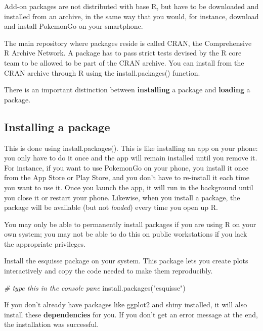 \documentclass[
  oneside]{book}
\newenvironment{Shaded}{\begin{snugshade}}{\end{snugshade}}
\newcommand{\CommentTok}[1]{\textcolor[rgb]{0.56,0.35,0.01}{\textit{#1}}}
\newcommand{\FunctionTok}[1]{\textcolor[rgb]{0.00,0.00,0.00}{#1}}
\newcommand{\NormalTok}[1]{#1}
\newcommand{\StringTok}[1]{\textcolor[rgb]{0.31,0.60,0.02}{#1}}
\begin{document}
Add-on packages are not distributed with base R, but have to be downloaded and installed from an archive, in the same way that you would, for instance, download and install PokemonGo on your smartphone.

The main repository where packages reside is called CRAN, the Comprehensive R Archive Network. A package has to pass strict tests devised by the R core team to be allowed to be part of the CRAN archive. You can install from the CRAN archive through R using the {install.packages}{(}{)} function.

There is an important distinction between \textbf{installing} a package and \textbf{loading} a package.

\hypertarget{installing-a-package}{%
\subsection{Installing a package}\label{installing-a-package}}

This is done using {install.packages}{(}{)}. This is like installing an app on your phone: you only have to do it once and the app will remain installed until you remove it. For instance, if you want to use PokemonGo on your phone, you install it once from the App Store or Play Store, and you don't have to re-install it each time you want to use it. Once you launch the app, it will run in the background until you close it or restart your phone. Likewise, when you install a package, the package will be available (but not \emph{loaded}) every time you open up R.

\begin{warning}
You may only be able to permanently install packages if you are using R on your own system; you may not be able to do this on public workstations if you lack the appropriate privileges.

\end{warning}

Install the esquisse package on your system. This package lets you create plots interactively and copy the code needed to make them reproducibly.

\begin{Shaded}
\begin{Highlighting}[]
\CommentTok{\# type this in the console pane}
\FunctionTok{install.packages}\NormalTok{(}\StringTok{"esquisse"}\NormalTok{)}
\end{Highlighting}
\end{Shaded}

If you don't already have packages like ggplot2 and shiny installed, it will also install these \textbf{dependencies} for you. If you don't get an error message at the end, the installation was successful.
\end{document}
